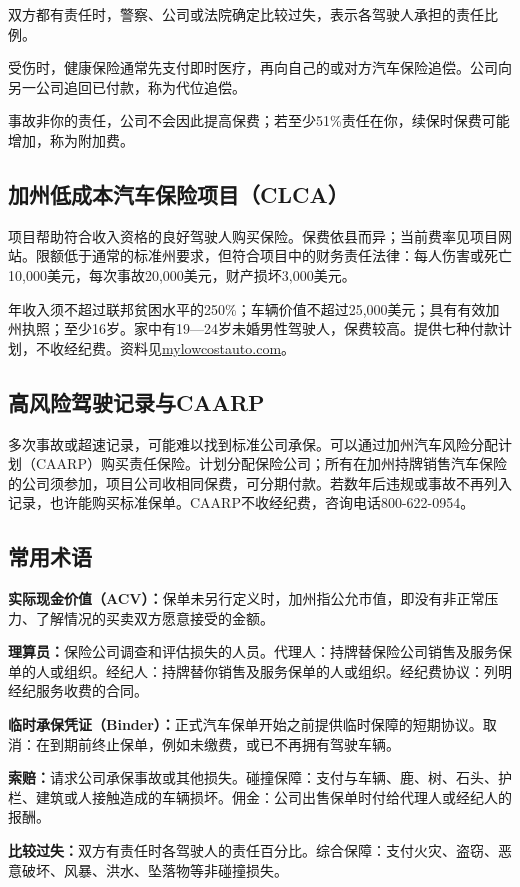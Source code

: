 \documentclass[UTF8,fontset=none,11pt,a4paper]{ctexart}
\begin{document}
双方都有责任时，警察、公司或法院确定比较过失，表示各驾驶人承担的责任比例。


受伤时，健康保险通常先支付即时医疗，再向自己的或对方汽车保险追偿。公司向另一公司追回已付款，称为代位追偿。


事故非你的责任，公司不会因此提高保费；若至少51\%责任在你，续保时保费可能增加，称为附加费。


\subsection*{加州低成本汽车保险项目（CLCA）}
项目帮助符合收入资格的良好驾驶人购买保险。保费依县而异；当前费率见项目网站。限额低于通常的标准州要求，但符合项目中的财务责任法律：每人伤害或死亡10,000美元，每次事故20,000美元，财产损坏3,000美元。


年收入须不超过联邦贫困水平的250\%；车辆价值不超过25,000美元；具有有效加州执照；至少16岁。家中有19—24岁未婚男性驾驶人，保费较高。提供七种付款计划，不收经纪费。资料见\url{mylowcostauto.com}。


\subsection*{高风险驾驶记录与CAARP}
多次事故或超速记录，可能难以找到标准公司承保。可以通过加州汽车风险分配计划（CAARP）购买责任保险。计划分配保险公司；所有在加州持牌销售汽车保险的公司须参加，项目公司收相同保费，可分期付款。若数年后违规或事故不再列入记录，也许能购买标准保单。CAARP不收经纪费，咨询电话800-622-0954。


\subsection*{常用术语}
\textbf{实际现金价值（ACV）：}保单未另行定义时，加州指公允市值，即没有非正常压力、了解情况的买卖双方愿意接受的金额。


\textbf{理算员：}保险公司调查和评估损失的人员。代理人：持牌替保险公司销售及服务保单的人或组织。经纪人：持牌替你销售及服务保单的人或组织。经纪费协议：列明经纪服务收费的合同。


\textbf{临时承保凭证（Binder）：}正式汽车保单开始之前提供临时保障的短期协议。取消：在到期前终止保单，例如未缴费，或已不再拥有驾驶车辆。


\textbf{索赔：}请求公司承保事故或其他损失。碰撞保障：支付与车辆、鹿、树、石头、护栏、建筑或人接触造成的车辆损坏。佣金：公司出售保单时付给代理人或经纪人的报酬。


\textbf{比较过失：}双方有责任时各驾驶人的责任百分比。综合保障：支付火灾、盗窃、恶意破坏、风暴、洪水、坠落物等非碰撞损失。
\end{document}
